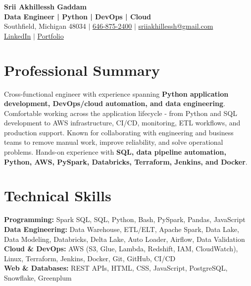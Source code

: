 \documentclass[letterpaper,10pt]{article}
\begin{document}
\fontsize{9.35pt}{10.45pt}\selectfont

\begin{center}
    {\LARGE \textbf{Srii Akhillessh Gaddam}} \\[-1pt]
    \textbf{Data Engineer | Python | DevOps | Cloud} \\[2pt]
    Southfield, Michigan 48034 $|$
    \href{tel:6468752400}{646-875-2400} $|$
    \href{mailto:sriiakhillessh@gmail.com}{sriiakhillessh@gmail.com} \\[1pt]
    \href{https://www.linkedin.com/in/srii-akhiilessh-gaddam-b48668191/}{LinkedIn} $|$
    \href{https://sriiakhillesshg.github.io/portfolio/}{Portfolio}
\end{center}
\vspace{-8pt}

\section{Professional Summary}
\small{Cross-functional engineer with experience spanning \textbf{Python application development, DevOps/cloud automation, and data engineering}. Comfortable working across the application lifecycle - from Python and SQL development to AWS infrastructure, CI/CD, monitoring, ETL workflows, and production support. Known for collaborating with engineering and business teams to remove manual work, improve reliability, and solve operational problems. Hands-on experience with \textbf{SQL, data pipeline automation, Python, AWS, PySpark, Databricks, Terraform, Jenkins, and Docker}.}

\section{Technical Skills}
\small{
\textbf{Programming:} Spark SQL, SQL, Python, Bash, PySpark, Pandas, JavaScript \\
\textbf{Data Engineering:} Data Warehouse, ETL/ELT, Apache Spark, Data Lake, Data Modeling, Databricks, Delta Lake, Auto Loader, Airflow, Data Validation \\
\textbf{Cloud \& DevOps:} AWS (S3, Glue, Lambda, Redshift, IAM, CloudWatch), Linux, Terraform, Jenkins, Docker, Git, GitHub, CI/CD \\
\textbf{Web \& Databases:} REST APIs, HTML, CSS, JavaScript, PostgreSQL, Snowflake, Greenplum
}
\end{document}
